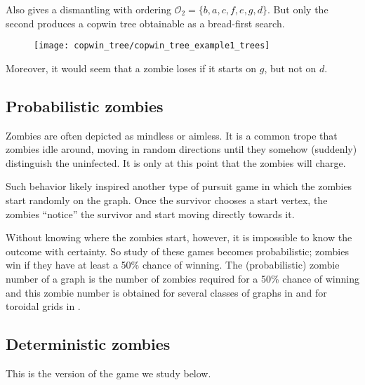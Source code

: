 Also gives a dismantling with ordering $\mathcal{O}_2 = \{b, a, c, f, e, g, d \}$.
But only the second produces a copwin tree obtainable as a bread-first search.

\begin{figure}[h!]
\centering
\texttt{[image: copwin\_tree/copwin\_tree\_example1\_trees]}
\end{figure}

Moreover, it would seem that a zombie loses if it starts on $g$, but not on $d$.


\subsection{Probabilistic zombies}

Zombies are often depicted as mindless or aimless. It is a common trope that zombies
idle around, moving in random directions until they somehow (suddenly) distinguish
the uninfected. It is only at this point that the zombies will charge.

Such behavior likely inspired another type of pursuit game in which the zombies start randomly on
the graph. Once the survivor chooses a start vertex, the zombies ``notice'' the survivor and start
moving directly towards it.

Without knowing where the zombies start, however, it is impossible to know the outcome with certainty.
So study of these games becomes probabilistic; zombies win if they have at least a 50\% chance of winning.
The (probabilistic) zombie number of a graph is the number of zombies required for a 50\% chance of winning and this zombie number is
obtained for several classes of graphs in \cite{bonato2016probabilistic} and for
toroidal grids in \cite{pralat2019many}.

\subsection{Deterministic zombies}

This is the version of the game we study below.
